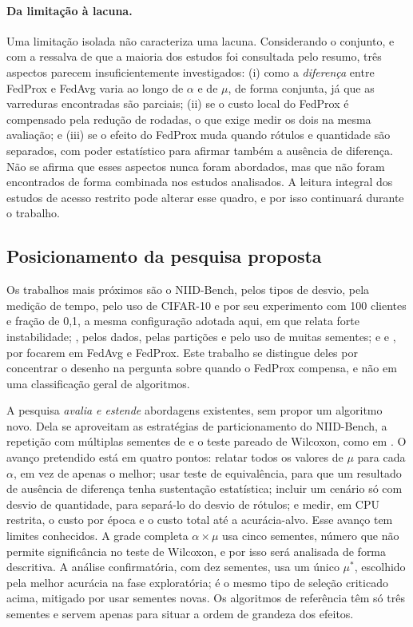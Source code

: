 \paragraph{Da limitação à lacuna.}
Uma limitação isolada não caracteriza uma lacuna. Considerando o conjunto, e com a ressalva de que a maioria dos estudos foi consultada pelo resumo, três aspectos parecem insuficientemente investigados: (i) como a \emph{diferença} entre FedProx e FedAvg varia ao longo de $\alpha$ e de $\mu$, de forma conjunta, já que as varreduras encontradas são parciais; (ii) se o custo local do FedProx é compensado pela redução de rodadas, o que exige medir os dois na mesma avaliação; e (iii) se o efeito do FedProx muda quando rótulos e quantidade são separados, com poder estatístico para afirmar também a ausência de diferença. Não se afirma que esses aspectos nunca foram abordados, mas que não foram encontrados de forma combinada nos estudos analisados. A leitura integral dos estudos de acesso restrito pode alterar esse quadro, e por isso continuará durante o trabalho.

\subsection{Posicionamento da pesquisa proposta}

Os trabalhos mais próximos são o NIID-Bench, pelos tipos de desvio, pela medição de tempo, pelo uso de CIFAR-10 e por seu experimento com 100 clientes e fração de 0,1, a mesma configuração adotada aqui, em que relata forte instabilidade; \citet{enang2026optimiser}, pelos dados, pelas partições e pelo uso de muitas sementes; e \citet{sevinc2025distribution} e \citet{ananouch2025optimization}, por focarem em FedAvg e FedProx. Este trabalho se distingue deles por concentrar o desenho na pergunta sobre quando o FedProx compensa, e não em uma classificação geral de algoritmos.

A pesquisa \emph{avalia e estende} abordagens existentes, sem propor um algoritmo novo. Dela se aproveitam as estratégias de particionamento do NIID-Bench, a repetição com múltiplas sementes de \citet{enang2026optimiser} e o teste pareado de Wilcoxon, como em \citet{quintana2026mammography}. O avanço pretendido está em quatro pontos: relatar todos os valores de $\mu$ para cada $\alpha$, em vez de apenas o melhor; usar teste de equivalência, para que um resultado de ausência de diferença tenha sustentação estatística; incluir um cenário só com desvio de quantidade, para separá-lo do desvio de rótulos; e medir, em CPU restrita, o custo por época e o custo total até a acurácia-alvo. Esse avanço tem limites conhecidos. A grade completa $\alpha \times \mu$ usa cinco sementes, número que não permite significância no teste de Wilcoxon, e por isso será analisada de forma descritiva. A análise confirmatória, com dez sementes, usa um único $\mu^*$, escolhido pela melhor acurácia na fase exploratória; é o mesmo tipo de seleção criticado acima, mitigado por usar sementes novas. Os algoritmos de referência têm só três sementes e servem apenas para situar a ordem de grandeza dos efeitos.

